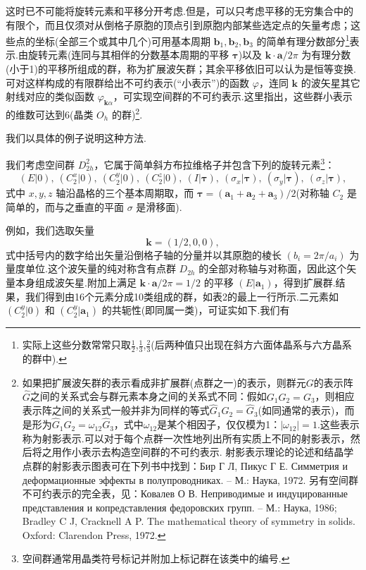 这时已不可能将旋转元素和平移分开考虑.但是，可以只考虑平移的无穷集合中的有限个，而且仅须对从倒格子原胞的顶点引到原胞内部某些选定点的矢量考虑；这些点的坐标(全部三个或其中几个)可用基本周期 $\boldsymbol{b}_1,\boldsymbol{b}_2,\boldsymbol{b}_3$ 的简单有理分数部分\footnote{实际上这些分数常常只取$\frac{1}{2}$,$\frac{1}{3}$,$\frac{2}{3}$(后两种值只出现在斜方六面体晶系与六方晶系的群中).}表示.由旋转元素(连同与其相伴的分数基本周期的平移 $\boldsymbol{\tau}$)以及 $\boldsymbol{k}\cdot\boldsymbol{a}/2\pi$ 为有理分数(小于1)的平移所组成的群，称为扩展波矢群；其余平移依旧可以认为是恒等变换.可对这样构成的有限群给出不可约表示(“小表示”)的函数 $\varphi$，连同 $\boldsymbol{k}$ 的波矢星其它射线对应的类似函数 $\varphi_{\boldsymbol{k}\alpha}$，可实现空间群的不可约表示.这里指出，这些群小表示的维数可达到6(晶类 $O_h$ 的群)\footnote{如果把扩展波矢群的表示看成非扩展群(点群之一)的表示，则群元$G$的表示阵$\hat{G}$之间的关系式会与群元素本身之间的关系式不同：假如$G_1G_2=G_3$，则相应表示阵之间的关系式一般并非为同样的等式$\hat{G}_1\hat{G}_2=\hat{G}_3$(如同通常的表示)，而是形为$\hat{G}_1\hat{G}_2=\omega_{12}\hat{G}_3$，式中$\omega_{12}$是某个相因子，仅仅模为1：$|\omega_{12}|=1$.这些表示称为射影表示.可以对于每个点群一次性地列出所有实质上不同的射影表示，然后将之用作小表示去构造空间群的不可约表示.
射影表示理论的论述和结晶学点群的射影表示图表可在下列书中找到：Бир Г Л, Пикус Г Е. Симметрия и деформационные эффекты в полупроводниках. – М.: Наука, 1972.
另有空间群不可约表示的完全表，见：Ковалев О В. Неприводимые и индуцированные представления и копредставления федоровских групп. – М.: Наука, 1986; Bradley C J, Cracknell A P. The mathematical theory of symmetry in solids. Oxford: Clarendon Press, 1972.}.

我们以具体的例子说明这种方法.

我们考虑空间群 $D_{2h}^2$，它属于简单斜方布拉维格子并包含下列的旋转元素\footnote{空间群通常用晶类符号标记并附加上标记群在该类中的编号.}：
\begin{equation*}
  (E|0),\ (C_2^x|0),\ (C_2^y|0),\ (C_2^z|0),\ (I|\boldsymbol{\tau}),\
  (\sigma_x|\boldsymbol{\tau}),\ (\sigma_y|\boldsymbol{\tau}),\
  (\sigma_z|\boldsymbol{\tau}),
\end{equation*}
式中 $x,y,z$ 轴沿晶格的三个基本周期取，而 $\boldsymbol{\tau}=(\boldsymbol{a}_1+\boldsymbol{a}_2+\boldsymbol{a}_3)/2$(对称轴 $C_2$ 是简单的，而与之垂直的平面 $\sigma$ 是滑移面).

例如，我们选取矢量
\begin{equation}
  \boldsymbol{k}=(1/2,0,0),
\end{equation}
式中括号内的数字给出矢量沿倒格子轴的分量并以其原胞的棱长 $(b_i=2\pi/a_i)$ 为量度单位.这个波矢量的纯对称含有点群 $D_{2h}$ 的全部对称轴与对称面，因此这个矢量本身组成波矢星.附加上满足 $\boldsymbol{k}\cdot\boldsymbol{a}/2\pi=1/2$ 的平移 $(E|\boldsymbol{a}_1)$，得到扩展群.结果，我们得到由16个元素分成10类组成的群，如表2的最上一行所示.二元素如 $(C_2^y|0)$ 和 $(C_2^y|\boldsymbol{a}_1)$ 的共轭性(即同属一类)，可证实如下.我们有

